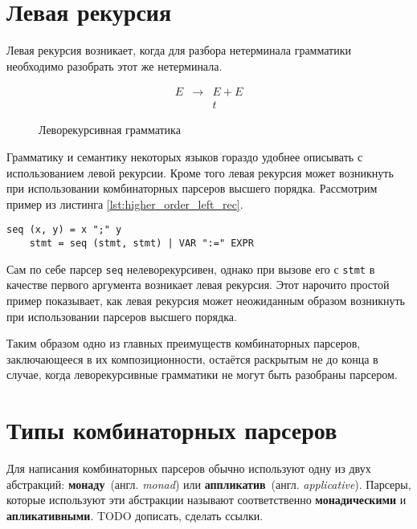 \documentclass[times]{itmo-student-thesis}
\begin{document}
\section{Левая рекурсия}\label{sec:left_recursion}

Левая рекурсия возникает, когда для разбора нетерминала грамматики необходимо разобрать этот же нетерминала. 

\begin{figure}[!h]
    \caption{Леворекурсивная грамматика}\label{leftrec_grammar}
    \[
        \begin{array}{lll}
            E & \to & E+E \\
              &     & t
        \end{array}
    \]
\end{figure}

Грамматику и семантику некоторых языков гораздо удобнее описывать с использованием левой рекурсии. Кроме того
левая рекурсия может возникнуть при использовании комбинаторных парсеров высшего порядка. Рассмотрим пример из листинга 
\ref{lst:higher_order_left_rec}.

\begin{lstlisting}[float=!h,caption={Возникновение левой рекурсии},label={lst:higher_order_left_rec}]
    seq (x, y) = x ";" y
    stmt = seq (stmt, stmt) | VAR ":=" EXPR
\end{lstlisting}

Сам по себе парсер \lstinline{seq} нелеворекурсивен, однако при вызове его с \lstinline{stmt} в качестве первого аргумента возникает левая рекурсия.
Этот нарочито простой пример показывает, как левая рекурсия может неожиданным образом возникнуть при использовании
парсеров высшего порядка.

Таким образом одно из главных преимуществ комбинаторных парсеров, заключающееся в их композиционности, остаётся
раскрытым не до конца в случае, когда леворекурсивные грамматики не могут быть разобраны парсером.

\section{Типы комбинаторных парсеров}\label{sec:parser_combinators_types}

Для написания комбинаторных парсеров обычно используют одну из двух абстракций: \textbf{монаду}~(англ. \textit{monad}) 
или \textbf{аппликатив}~(англ. \textit{applicative}). Парсеры, которые используют эти абстракции называют соответственно 
\textbf{монадическими} и \textbf{апликативными}. TODO дописать, сделать ссылки.
\end{document}
